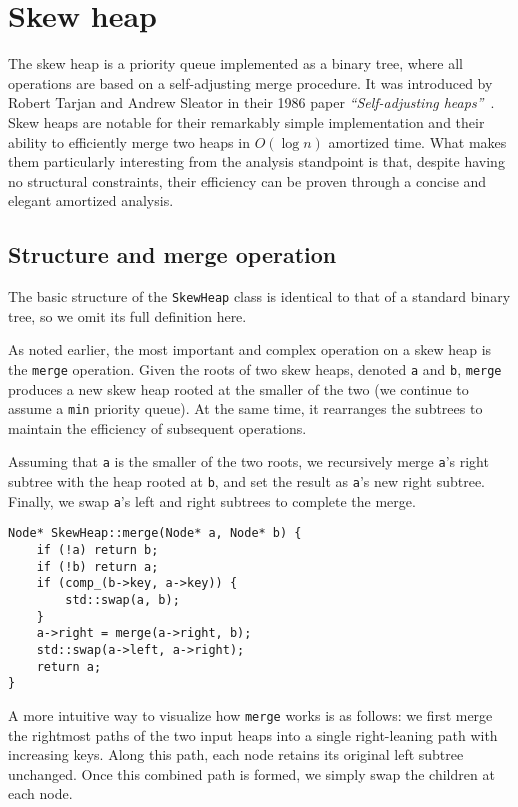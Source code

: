 \section{Skew heap}

The skew heap is a priority queue implemented as a binary tree, where all operations are based on a self-adjusting merge procedure. It was introduced by Robert Tarjan and Andrew Sleator in their 1986 paper \emph{``Self-adjusting heaps''}~\cite{SleatorTarjan1986}. Skew heaps are notable for their remarkably simple implementation and their ability to efficiently merge two heaps in \( O(\log n) \) amortized time. What makes them particularly interesting from the analysis standpoint is that, despite having no structural constraints, their efficiency can be proven through a concise and elegant amortized analysis.

\subsection{Structure and merge operation}

The basic structure of the \texttt{SkewHeap} class is identical to that of a standard binary tree, so we omit its full definition here.

As noted earlier, the most important and complex operation on a skew heap is the \texttt{merge} operation. Given the roots of two skew heaps, denoted \texttt{a} and \texttt{b}, \texttt{merge} produces a new skew heap rooted at the smaller of the two (we continue to assume a \texttt{min} priority queue). At the same time, it rearranges the subtrees to maintain the efficiency of subsequent operations.

Assuming that \texttt{a} is the smaller of the two roots, we recursively merge \texttt{a}'s right subtree with the heap rooted at \texttt{b}, and set the result as \texttt{a}'s new right subtree. Finally, we swap \texttt{a}'s left and right subtrees to complete the merge.

\begin{verbatim}
Node* SkewHeap::merge(Node* a, Node* b) {
    if (!a) return b;
    if (!b) return a;
    if (comp_(b->key, a->key)) {
        std::swap(a, b);
    }
    a->right = merge(a->right, b);
    std::swap(a->left, a->right);
    return a;
}
\end{verbatim}

A more intuitive way to visualize how \texttt{merge} works is as follows: we first merge the rightmost paths of the two input heaps into a single right-leaning path with increasing keys. Along this path, each node retains its original left subtree unchanged. Once this combined path is formed, we simply swap the children at each node.

